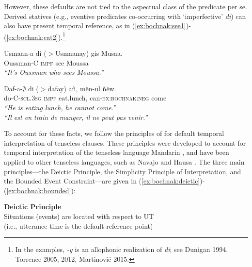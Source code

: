 \documentclass[output=paper]{langsci/langsci}
\begin{document}
However, these defaults are not tied to the aspectual class of the predicate
per se. Derived statives (e.g., eventive predicates co-occurring with
`imperfective'  \textit{di}) can also have present temporal reference,
as in (\ref{ex:bochnak:see1})-(\ref{ex:bochnak:eat2}).\footnote{In the examples, \textit{-y} is
an allophonic realization of \textit{di}; see Dunigan 1994, Torrence
2005, 2012, Martinovi\'c 2015.}



\ea
\gll Usmaan-a {di ($>$Usmaanay)} gis Musaa. \\
Oussman-C \textsc{impf} see Moussa \\
\glt \textit{``It's Oussman who sees Moussa.''}\label{ex:bochnak:see1}
\z

\ea
\gll Daf-a-$\emptyset$ {di ($>$dafay)} a\~n, m\"en-ul \~n\"ew.\\
do-C-\textsc{scl.3sg} \textsc{impf} eat.lunch, can-\textsc{ex:bochnak:neg} come\\
\glt \textit{``He is eating lunch, he cannot come.''}\\
\textit{``Il est en train de manger, il ne peut pas venir.''}\hfill\citep[p.~263]{robert91approche}\label{ex:bochnak:eat2}
\z




To account for these facts, we follow the principles of \citet{smith05temporal, smith07time} for default temporal interpretation of tenseless clauses. These principles were developed to account for temporal interpretation of the tenseless language Mandarin \citep{smith05temporal}, and have been applied to other tenseless languages, such as Navajo \citep{smith07time} and Hausa \citep{mucha13temporal}. The three main principles---the Deictic Principle, the Simplicity Principle of Interpretation, and the Bounded Event Constraint---are given in (\ref{ex:bochnak:deictic})-(\ref{ex:bochnak:bounded}):

\ea\label{ex:bochnak:deictic} \textbf{Deictic Principle} \\ Situations (events) are located with respect to UT \\(i.e., utterance time is the default reference point)
\z
\end{document}
